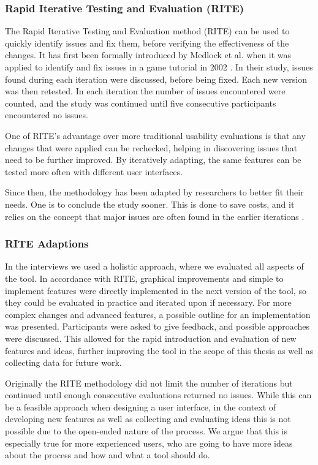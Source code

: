 \documentclass[a4paper,11pt,twoside]{article}
\theoremstyle{definition} %
\renewcommand{\cite}[1]{\citep{#1}}
\begin{document}
\subsubsection{Rapid Iterative Testing and Evaluation (RITE)} \label{SubSubSec:RITE}

The Rapid Iterative Testing and Evaluation method (RITE) can be used to quickly identify issues and fix them, before verifying the effectiveness of the changes. It has first been formally introduced by Medlock et al. when it was applied to identify and fix issues in a game tutorial in 2002 \cite{Medlock2007UsingTR}. In their study, issues found during each iteration were discussed, before being fixed. Each new version was then retested. In each iteration the number of issues encountered were counted, and the study was continued until five consecutive participants encountered no issues. 

One of RITE’s advantage over more traditional usability evaluations is that any changes that were applied can be rechecked, helping in discovering issues that need to be further improved. By iteratively adapting, the same features can be tested more often with different user interfaces. 

Since then, the methodology has been adapted by researchers to better fit their needs. One is to conclude the study sooner. This is done to save costs, and it relies on the concept that major issues are often found in the earlier iterations \cite{6606617, Rong2012TheEO}. 


\subsubsection{RITE Adaptions} \label{SubSubSec:RiteAdaptations}

In the interviews we used a holistic approach, where we evaluated all aspects of the tool. In accordance with RITE, graphical improvements and simple to implement features were directly implemented in the next version of the tool, so they could be evaluated in practice and iterated upon if necessary. For more complex changes and advanced features, a possible outline for an implementation was presented. Participants were asked to give feedback, and possible approaches were discussed. This allowed for the rapid introduction and evaluation of new features and ideas, further improving the tool in the scope of this thesis as well as collecting data for future work. 

Originally the RITE methodology did not limit the number of iterations but continued until enough consecutive evaluations returned no issues. While this can be a feasible approach when designing a user interface, in the context of developing new features as well as collecting and evaluating ideas this is not possible due to the open-ended nature of the process. We argue that this is especially true for more experienced users, who are going to have more ideas about the process and how and what a tool should do. 
\end{document}
